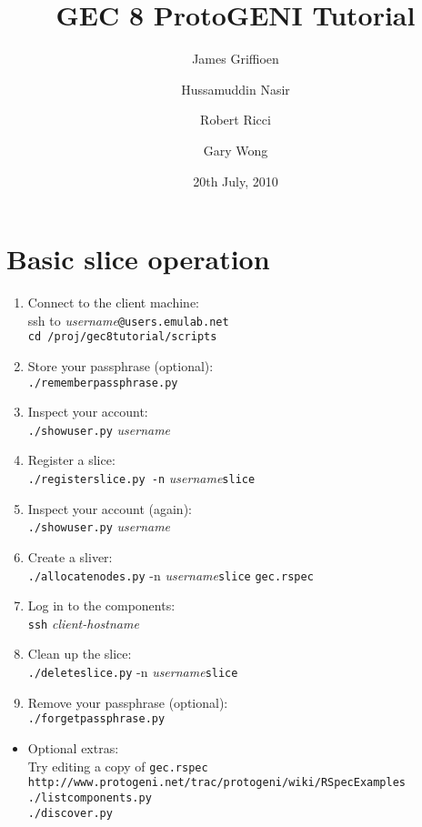 \documentclass{article}
\title{GEC 8 ProtoGENI Tutorial}
\date{20th July, 2010}
\author{James Griffioen \and Hussamuddin Nasir \and Robert Ricci \and
  Gary Wong}
\begin{document}
\maketitle
\section{Basic slice operation}
\begin{enumerate}
\item Connect to the client machine:\\
ssh to \emph{username}{\tt @users.emulab.net}\\
{\tt cd /proj/gec8tutorial/scripts}
\item Store your passphrase (optional):\\
{\tt ./rememberpassphrase.py}
\item Inspect your account:\\
{\tt ./showuser.py} \emph{username}
\item Register a slice:\\
{\tt ./registerslice.py -n} \emph{username}{\tt slice}
\item Inspect your account (again):\\
{\tt ./showuser.py} \emph{username}
\item Create a sliver:\\
{\tt ./allocatenodes.py} -n \emph{username}{\tt slice} {\tt gec.rspec}
\item Log in to the components:\\
{\tt ssh} \emph{client-hostname}
\item Clean up the slice:\\
{\tt ./deleteslice.py} -n \emph{username}{\tt slice}
\item Remove your passphrase (optional):\\
{\tt ./forgetpassphrase.py}
\end{enumerate}
\begin{itemize}
\item Optional extras:\\
Try editing a copy of {\tt gec.rspec}\\
{\tt http://www.protogeni.net/trac/protogeni/wiki/RSpecExamples}\\
{\tt ./listcomponents.py}\\
{\tt ./discover.py}
\end{itemize}
\end{document}

